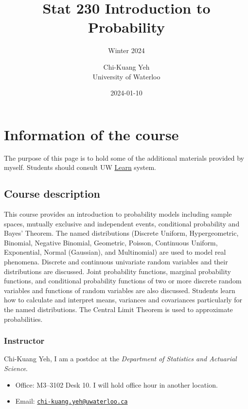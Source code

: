\documentclass[
]{book}
\title{Stat 230 Introduction to Probability}
\subtitle{Winter 2024}
\author{Chi-Kuang Yeh\\
University of Waterloo}
\date{2024-01-10}
\providecommand{\tightlist}{%
  \setlength{\itemsep}{0pt}\setlength{\parskip}{0pt}}
\theoremstyle{definition}
\theoremstyle{definition}
\theoremstyle{definition}
\theoremstyle{definition}
\theoremstyle{remark}
\begin{document}
\maketitle

{
\setcounter{tocdepth}{1}
\tableofcontents
}
\hypertarget{information-of-the-course}{%
\chapter{Information of the course}\label{information-of-the-course}}

The purpose of this page is to hold some of the additional materials provided by myself. Students should consult UW \href{https://api-4ccc589b.duosecurity.com/frame/v4/preauth/healthcheck?sid=frameless-c0657e9d-cb86-4ac9-a6a7-fd054ae21fd5}{Learn} system.

\hypertarget{course-description}{%
\section{Course description}\label{course-description}}

This course provides an introduction to probability models including sample spaces, mutually exclusive and independent events, conditional probability and Bayes' Theorem. The named distributions (Discrete Uniform, Hypergeometric, Binomial, Negative Binomial, Geometric, Poisson, Continuous Uniform, Exponential, Normal (Gaussian), and Multinomial) are used to model real phenomena. Discrete and continuous univariate random variables and their distributions are discussed. Joint probability functions, marginal probability functions, and conditional probability functions of two or more discrete random variables and functions of random variables are also discussed. Students learn how to calculate and interpret means, variances and covariances particularly for the named distributions. The Central Limit Theorem is used to approximate probabilities.

\hypertarget{instructor}{%
\subsection{Instructor}\label{instructor}}

Chi-Kuang Yeh, I am a postdoc at the \emph{Department of Statistics and Actuarial Science}.

\begin{itemize}
\tightlist
\item
  Office: M3--3102 Desk 10. I will hold office hour in another location.
\item
  Email: \href{mailto:chi-kuang.yeh@uwaterloo.ca}{\nolinkurl{chi-kuang.yeh@uwaterloo.ca}}
\end{itemize}
\end{document}
